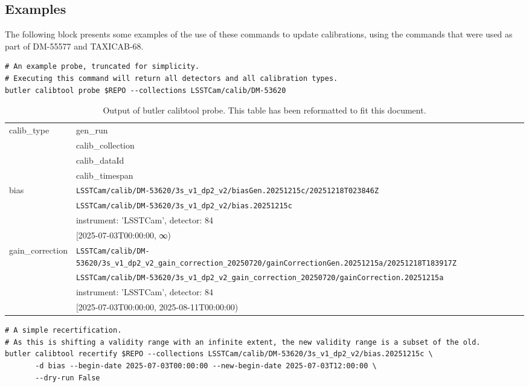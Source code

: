 \documentclass[DM,authoryear,toc]{lsstdoc}
\begin{document}
\subsection{Examples}
The following block presents some examples of the use of these commands to update calibrations, using the commands that were used as part of DM-55577 and TAXICAB-68.
\begin{footnotesize}
\begin{verbatim}
# An example probe, truncated for simplicity.
# Executing this command will return all detectors and all calibration types.
butler calibtool probe $REPO --collections LSSTCam/calib/DM-53620
\end{verbatim}

\begin{table}
  \scriptsize
  \caption{Output of butler calibtool probe.  This table has been reformatted to fit this document.}
  \begin{tabular}{l|l}
    \hline
    calib\_type & gen\_run \\
    & calib\_collection \\
    & calib\_dataId\\
    & calib\_timespan \\
    \hline
    bias        &\verb|LSSTCam/calib/DM-53620/3s_v1_dp2_v2/biasGen.20251215c/20251218T023846Z|  \\
                &\verb|LSSTCam/calib/DM-53620/3s_v1_dp2_v2/bias.20251215c| \\
                & {instrument: 'LSSTCam', detector: 84} \\
                & [2025-07-03T00:00:00, ∞) \\
    \hline
    gain\_correction &\verb|LSSTCam/calib/DM-53620/3s_v1_dp2_v2_gain_correction_20250720/gainCorrectionGen.20251215a/20251218T183917Z| \\
                & \verb|LSSTCam/calib/DM-53620/3s_v1_dp2_v2_gain_correction_20250720/gainCorrection.20251215a| \\
                & {instrument: 'LSSTCam', detector: 84} \\
                & [2025-07-03T00:00:00, 2025-08-11T00:00:00)\\
    \hline
  \end{tabular}
\end{table}

\begin{verbatim}
# A simple recertification.
# As this is shifting a validity range with an infinite extent, the new validity range is a subset of the old.
butler calibtool recertify $REPO --collections LSSTCam/calib/DM-53620/3s_v1_dp2_v2/bias.20251215c \
       -d bias --begin-date 2025-07-03T00:00:00 --new-begin-date 2025-07-03T12:00:00 \
       --dry-run False


\end{verbatim}
\end{footnotesize}
\end{document}
